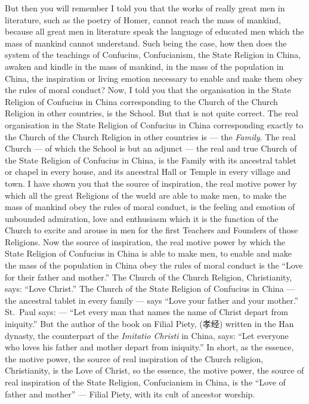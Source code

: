 But then you will remember I told you that the works of really great men in literature, such as the poetry of Homer, cannot reach the mass of mankind, because all great men in literature speak the language of educated men which the mass of mankind cannot understand.
Such being the case, how then does the system of the teachings of Confucius, Confucianism, the State Religion in China, awaken and kindle in the mass of mankind, in the mass of the population in China, the inspiration or living emotion necessary to enable and make them obey the rules of moral conduct?
Now, I told you that the organisation in the State Religion of Confucius in China corresponding to the Church of the Church Religion in other countries, is the School.
But that is not quite correct.
The real organisation in the State Religion of Confucius in China corresponding exactly to the Church of the Church Religion in other countries is --- the \emph{Family}.
The real Church --- of which the School is but an adjunct --- the real and true Church of the State Religion of Confucius in China, is the Family with its ancestral tablet or chapel in every house, and its ancestral Hall or Temple in every village and town.
I have shown you that the source of inspiration, the real motive power by which all the great Religions of the world are able to make men, to make the mass of mankind obey the rules of moral conduct, is the feeling and emotion of unbounded admiration, love and enthusiasm which it is the function of the Church to excite and arouse in men for the first Teachers and Founders of those Religions.
Now the source of inspiration, the real motive power by which the State Religion of Confucius in China is able to make men, to enable and make the mass of the population in China obey the rules of moral conduct is the ``Love for their father and mother.''
The Church of the Church Religion, Christianity, says: ``Love Christ.''
The Church of the State Religion of Confucius in China --- the ancestral tablet in every family --- says ``Love your father and your mother.''
St.~Paul says: --- ``Let every man that names the name of Christ depart from iniquity.''
But the author of the book on Filial Piety, (孝经) written in the Han dynasty, the counterpart of the \emph{Imitatio Christi}  in China, says: ``Let everyone who loves his father and mother depart from iniquity.''
In short, as the essence, the motive power, the source of real inspiration of the Church religion, Christianity, is the Love of Christ, so the essence, the motive power, the source of real inspiration of the State Religion, Confucianism in China, is the ``Love of father and mother'' --- Filial Piety, with its cult of ancestor worship.

